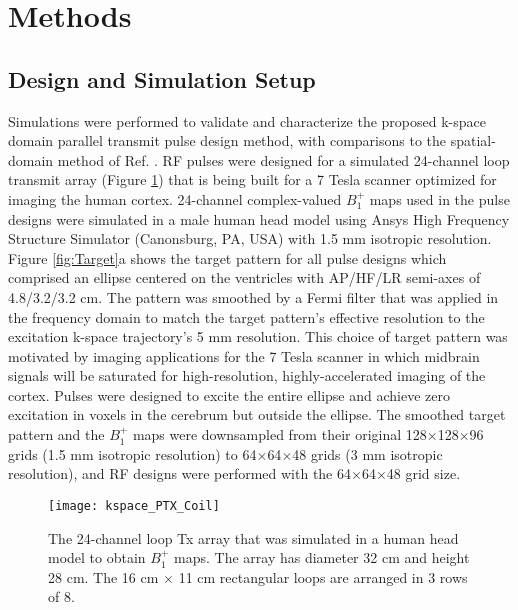 \section*{Methods}
\subsection*{Design and Simulation Setup}
Simulations were performed to validate and characterize the proposed k-space domain parallel transmit pulse design method,
with comparisons to the spatial-domain method of Ref. \cite{Grissom:2006:MRM}.
RF pulses were designed for a simulated 24-channel loop transmit array (Figure \ref{fig:Coil}) that is being built for a 7 Tesla scanner optimized
for imaging the human cortex.  
24-channel complex-valued $B_1^+$ maps used in the pulse designs were simulated in a male human head model using 
Ansys High Frequency Structure Simulator (Canonsburg, PA, USA) with 1.5 mm isotropic resolution. 
Figure \ref{fig:Target}a shows the target pattern for all pulse designs which comprised an ellipse centered on the ventricles with AP/HF/LR semi-axes of 4.8/3.2/3.2 cm.
The pattern was smoothed by a Fermi filter that was applied in the frequency domain to match the target pattern's effective resolution to the excitation k-space trajectory's 5 mm resolution.
This choice of target pattern was motivated by imaging applications for the 7 Tesla scanner 
in which midbrain signals will be saturated for high-resolution, highly-accelerated imaging of the cortex. 
Pulses were designed to excite the entire ellipse and achieve zero excitation in voxels in the cerebrum but outside the ellipse. 
The smoothed target pattern and the $B_1^+$ maps were downsampled from their original 128$\times$128$\times$96 grids (1.5 mm isotropic resolution) to 
64$\times$64$\times$48 grids (3 mm isotropic resolution),
and RF designs were performed with the 64$\times$64$\times$48 grid size. 


\begin{figure}
	\centering
	\texttt{[image: kspace\_PTX\_Coil]}
	\caption{The 24-channel loop Tx array that was simulated in a human head model to obtain $B_1^+$ maps. 
	The array has diameter 32 cm and height 28 cm. The 16 cm $\times$ 11 cm rectangular loops are arranged in 3 rows of 8.}
	\label{fig:Coil}
\end{figure}

